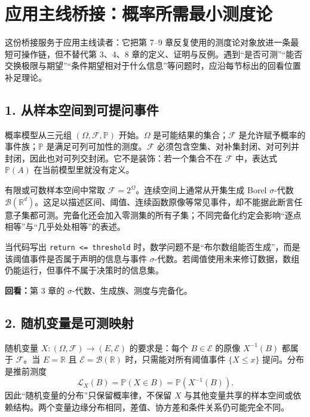 \chapter*{应用主线桥接：概率所需最小测度论}
\label{bridge:minimal-measure}

这份桥接服务于应用主线读者：它把第 7--9 章反复使用的测度论对象放进一条最短可操作链，但不替代第 3、4、8 章的定义、证明与反例。遇到“是否可测”“能否交换极限与期望”“条件期望相对于什么信息”等问题时，应沿每节标出的回看位置补足理论。

\section*{1. 从样本空间到可提问事件}

概率模型从三元组 $(\Omega,\mathcal F,\mathbb P)$ 开始。$\Omega$ 是可能结果的集合；$\mathcal F$ 是允许赋予概率的事件族；$\mathbb P$ 是满足可列可加性的测度。$\mathcal F$ 必须包含空集、对补集封闭、对可列并封闭，因此也对可列交封闭。它不是装饰：若一个集合不在 $\mathcal F$ 中，表达式 $\mathbb P(A)$ 在当前模型里就没有定义。

有限或可数样本空间中常取 $\mathcal F=2^\Omega$。连续空间上通常从开集生成 Borel $\sigma$-代数 $\mathcal B(\mathbb R^d)$。这足以描述区间、阈值、连续函数原像等常见事件，却不能据此断言任意子集都可测。完备化还会加入零测集的所有子集；不同完备化约定会影响“逐点相等”与“几乎处处相等”的表述。

\begin{diagnostic}
当代码写出 \texttt{return <= threshold} 时，数学问题不是“布尔数组能否生成”，而是该阈值事件是否属于声明的信息与事件 $\sigma$-代数。若阈值使用未来修订数据，数组仍能运行，但事件不属于决策时的信息集。
\end{diagnostic}

\noindent\textbf{回看：}第 3 章的 $\sigma$-代数、生成族、测度与完备化。

\section*{2. 随机变量是可测映射}

随机变量 $X:(\Omega,\mathcal F)\to(E,\mathcal E)$ 的要求是：每个 $B\in\mathcal E$ 的原像 $X^{-1}(B)$ 都属于 $\mathcal F$。当 $E=\mathbb R$ 且 $\mathcal E=\mathcal B(\mathbb R)$ 时，只需能对所有阈值事件 $\{X\le x\}$ 提问。分布是推前测度
\[
 \mathcal L_X(B)=\mathbb P(X\in B)=\mathbb P\!\left(X^{-1}(B)\right).
\]
因此“随机变量的分布”只保留概率律，不保留 $X$ 与其他变量共享的样本空间或依赖结构。两个变量边缘分布相同，差值、协方差和条件关系仍可能完全不同。

